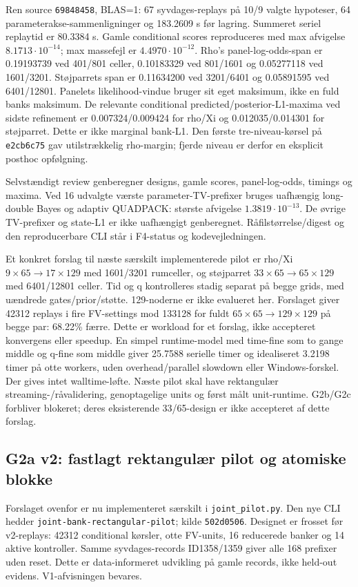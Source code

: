 Ren source \texttt{69848458}, BLAS=1: 67 syvdages-replays på 10/9 valgte
hypoteser, 64 parameterakse-sammenligninger og 183.2609 s før lagring.
Summeret seriel replaytid er 80.3384 s. Gamle conditional scores reproduceres
med max afvigelse $8.1713\cdot10^{-14}$; max massefejl er $4.4970\cdot10^{-12}$.
Rho's panel-log-odds-span er 0.19193739 ved 401/801 celler, 0.10183329 ved
801/1601 og 0.05277118 ved 1601/3201. Støjparrets span er 0.11634200 ved
3201/6401 og 0.05891595 ved 6401/12801. Panelets likelihood-vindue bruger
sit eget maksimum, ikke en fuld banks maksimum. De relevante conditional
predicted/posterior-L1-maxima ved sidste refinement er 0.007324/0.009424
for rho/Xi og 0.012035/0.014301 for støjparret. Dette er ikke marginal bank-L1.
Den første tre-niveau-kørsel på \texttt{e2cb6c75} gav utilstrækkelig rho-margin;
fjerde niveau er derfor en eksplicit posthoc opfølgning.

Selvstændigt review genberegner designs, gamle scores, panel-log-odds,
timings og maxima. Ved 16 udvalgte værste parameter-TV-prefixer bruges
uafhængig long-double Bayes og adaptiv QUADPACK: største afvigelse
$1.3819\cdot10^{-13}$. De øvrige TV-prefixer og state-L1 er ikke uafhængigt
genberegnet. Råfilstørrelse/digest og den reproducerbare CLI står i
F4-status og kodevejledningen.

Et konkret forslag til næste særskilt implementerede pilot er rho/Xi
$9\times65\to17\times129$ med 1601/3201 rumceller, og støjparret
$33\times65\to65\times129$ med 6401/12801 celler. Tid og q kontrolleres
stadig separat på begge grids, med uændrede gates/prior/støtte. 129-noderne
er ikke evalueret her. Forslaget giver 42312 replays i fire FV-settings mod
133128 for fuldt $65\times65\to129\times129$ på begge par: 68.22\% færre.
Dette er workload for et forslag, ikke accepteret konvergens eller speedup.
En simpel runtime-model med time-fine som to gange middle og q-fine som
middle giver 25.7588 serielle timer og idealiseret 3.2198 timer på otte workers,
uden overhead/parallel slowdown eller Windows-forskel. Der gives intet
walltime-løfte. Næste pilot skal have rektangulær streaming-/råvalidering,
genoptagelige units og først målt unit-runtime. G2b/G2c forbliver blokeret;
deres eksisterende 33/65-design er ikke accepteret af dette forslag.



\subsection{G2a v2: fastlagt rektangulær pilot og atomiske blokke}
Forslaget ovenfor er nu implementeret særskilt i \texttt{joint\_pilot.py}.
Den nye CLI hedder
\texttt{joint-bank-\allowbreak{}rectangular-\allowbreak{}pilot};
kilde \texttt{502d0506}.
Designet er frosset før v2-replays: 42312 conditional kørsler, otte FV-units,
16 reducerede banker og 14 aktive kontroller. Samme syvdages-records
ID1358/1359 giver alle 168 prefixer uden reset. Dette er data-informeret
udvikling på gamle records, ikke held-out evidens. V1-afvisningen bevares.

